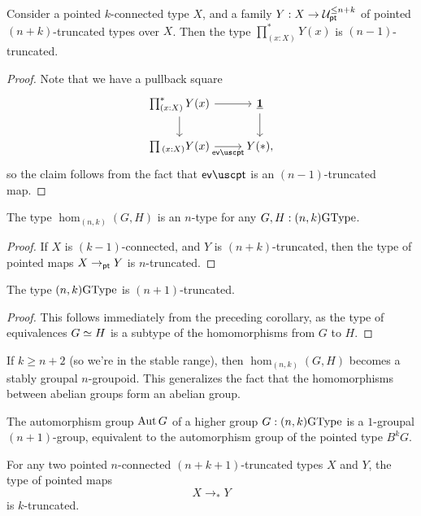 \begin{cor}
Consider a pointed $k$-connected type $X$, and a family $Y:X\to\mathcal{U}_{\mathsf{pt}}^{\le n+k}$ of pointed $(n+k)$-truncated types over $X$. Then the type $\prod_{(x:X)}^\ast Y(x)$ is $(n-1)$-truncated.
\end{cor}

\begin{proof}
Note that we have a pullback square
\begin{equation*}
\begin{tikzcd}
\textstyle{\prod_{(x:X)}^\ast Y(x)} \arrow[r] \arrow[d] & \unit \arrow[d] \\
\prd{x:X}Y(x) \arrow[r,swap,"\evpt"] & Y(\ast),
\end{tikzcd}
\end{equation*}
so the claim follows from the fact that $\evpt$ is an $(n-1)$-truncated map.
\end{proof}

\begin{thm}
  The type $\hom_{(n,k)}(G,H)$ is an $n$-type for any $G,H:(n,k)\mathrm{GType}$.
\end{thm}

\begin{proof}
  If $X$ is $(k-1)$-connected, and $Y$ is $(n+k)$-truncated, then the type of pointed maps $X \to_{\mathsf{pt}} Y$ is $n$-truncated.
\end{proof}

\begin{cor}
  The type $(n,k)\mathrm{GType}$ is $(n+1)$-truncated.
\end{cor}
\begin{proof}
  This follows immediately from the preceding corollary, as the type
  of equivalences $G \simeq H$ is a subtype of the homomorphisms from
  $G$ to $H$.
\end{proof}

If $k\ge n+2$ (so we're in the stable range), then $\hom_{(n,k)}(G,H)$
becomes a stably groupal $n$-groupoid. This generalizes the
fact that the homomorphisms between abelian groups form an abelian
group.

\begin{cor}
The automorphism group $\operatorname{Aut} G$ of a higher group $G:(n,k)\mathrm{GType}$ is a $1$-groupal $(n+1)$-group, equivalent to the automorphism group of the pointed type $B^kG$.
\end{cor}

\begin{prp}
  For any two pointed $n$-connected $(n+k+1)$-truncated types $X$ and $Y$, the type of pointed maps
  \begin{equation*}
    X\to_\ast Y
  \end{equation*}
  is $k$-truncated. 
\end{prp}

